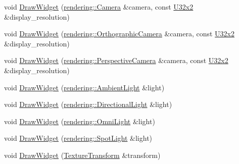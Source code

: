 \begin{DoxyCompactItemize}
\item 
void \mbox{\hyperlink{namespacemage_1_1script_1_1anonymous__namespace_02editor__script_8cpp_03_a0ccfdbcbbed7eb38dda2119cd6d91c5e}{Draw\+Widget}} (\mbox{\hyperlink{classmage_1_1rendering_1_1_camera}{rendering\+::\+Camera}} \&camera, const \mbox{\hyperlink{namespacemage_a31f2bb52b5080e706e1c13de07c0a249}{U32x2}} \&display\+\_\+resolution)
\item 
void \mbox{\hyperlink{namespacemage_1_1script_1_1anonymous__namespace_02editor__script_8cpp_03_a8245978cf439e5e006cc04a5e3b8c454}{Draw\+Widget}} (\mbox{\hyperlink{classmage_1_1rendering_1_1_orthographic_camera}{rendering\+::\+Orthographic\+Camera}} \&camera, const \mbox{\hyperlink{namespacemage_a31f2bb52b5080e706e1c13de07c0a249}{U32x2}} \&display\+\_\+resolution)
\item 
void \mbox{\hyperlink{namespacemage_1_1script_1_1anonymous__namespace_02editor__script_8cpp_03_a30d488a4869cbdc33a95a38eb2754277}{Draw\+Widget}} (\mbox{\hyperlink{classmage_1_1rendering_1_1_perspective_camera}{rendering\+::\+Perspective\+Camera}} \&camera, const \mbox{\hyperlink{namespacemage_a31f2bb52b5080e706e1c13de07c0a249}{U32x2}} \&display\+\_\+resolution)
\item 
void \mbox{\hyperlink{namespacemage_1_1script_1_1anonymous__namespace_02editor__script_8cpp_03_a8fae9ee9468220d523f8342c0b84d577}{Draw\+Widget}} (\mbox{\hyperlink{classmage_1_1rendering_1_1_ambient_light}{rendering\+::\+Ambient\+Light}} \&light)
\item 
void \mbox{\hyperlink{namespacemage_1_1script_1_1anonymous__namespace_02editor__script_8cpp_03_ae09b38a4a757ecd67e944a9605030d03}{Draw\+Widget}} (\mbox{\hyperlink{classmage_1_1rendering_1_1_directional_light}{rendering\+::\+Directional\+Light}} \&light)
\item 
void \mbox{\hyperlink{namespacemage_1_1script_1_1anonymous__namespace_02editor__script_8cpp_03_a6be8a0f5d812d1d6ef9f2b6227213f77}{Draw\+Widget}} (\mbox{\hyperlink{classmage_1_1rendering_1_1_omni_light}{rendering\+::\+Omni\+Light}} \&light)
\item 
void \mbox{\hyperlink{namespacemage_1_1script_1_1anonymous__namespace_02editor__script_8cpp_03_a4a986ab674be382e62fe0c0eda23bd3a}{Draw\+Widget}} (\mbox{\hyperlink{classmage_1_1rendering_1_1_spot_light}{rendering\+::\+Spot\+Light}} \&light)
\item 
void \mbox{\hyperlink{namespacemage_1_1script_1_1anonymous__namespace_02editor__script_8cpp_03_a7bbc1424508f604bffd94a90a823bd62}{Draw\+Widget}} (\mbox{\hyperlink{classmage_1_1_texture_transform}{Texture\+Transform}} \&transform)

\end{DoxyCompactItemize}

